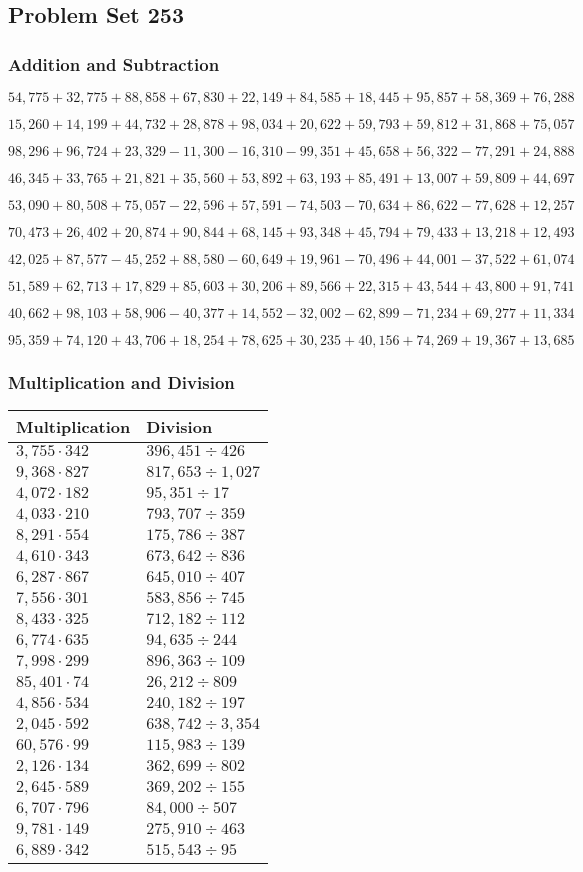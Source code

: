 \hypertarget{problem-set-253}{%
\subsection{Problem Set 253}\label{problem-set-253}}

\hypertarget{addition-and-subtraction}{%
\subsubsection{Addition and
Subtraction}\label{addition-and-subtraction}}

\(54,775+32,775+88,858+67,830+22,149+84,585+18,445+95,857+58,369+76,288\)

\(15,260+14,199+44,732+28,878+98,034+20,622+59,793+59,812+31,868+75,057\)

\(98,296+96,724+23,329-11,300-16,310-99,351+45,658+56,322-77,291+24,888\)

\(46,345+33,765+21,821+35,560+53,892+63,193+85,491+13,007+59,809+44,697\)

\(53,090+80,508+75,057-22,596+57,591-74,503-70,634+86,622-77,628+12,257\)

\(70,473+26,402+20,874+90,844+68,145+93,348+45,794+79,433+13,218+12,493\)

\(42,025+87,577-45,252+88,580-60,649+19,961-70,496+44,001-37,522+61,074\)

\(51,589+62,713+17,829+85,603+30,206+89,566+22,315+43,544+43,800+91,741\)

\(40,662+98,103+58,906-40,377+14,552-32,002-62,899-71,234+69,277+11,334\)

\(95,359+74,120+43,706+18,254+78,625+30,235+40,156+74,269+19,367+13,685\)

\hypertarget{multiplication-and-division}{%
\subsubsection{Multiplication and
Division}\label{multiplication-and-division}}

\begin{longtable}[]{@{}ll@{}}
\toprule
Multiplication & Division\tabularnewline
\midrule
\endhead
\(3,755\cdot342\) & \(396,451÷426\)\tabularnewline
\(9,368\cdot827\) & \(817,653÷1,027\)\tabularnewline
\(4,072\cdot182\) & \(95,351÷17\)\tabularnewline
\(4,033\cdot210\) & \(793,707÷359\)\tabularnewline
\(8,291\cdot554\) & \(175,786÷387\)\tabularnewline
\(4,610\cdot343\) & \(673,642÷836\)\tabularnewline
\(6,287\cdot867\) & \(645,010÷407\)\tabularnewline
\(7,556\cdot301\) & \(583,856÷745\)\tabularnewline
\(8,433\cdot325\) & \(712,182÷112\)\tabularnewline
\(6,774\cdot635\) & \(94,635÷244\)\tabularnewline
\(7,998\cdot299\) & \(896,363÷109\)\tabularnewline
\(85,401\cdot74\) & \(26,212÷809\)\tabularnewline
\(4,856\cdot534\) & \(240,182÷197\)\tabularnewline
\(2,045\cdot592\) & \(638,742÷3,354\)\tabularnewline
\(60,576\cdot99\) & \(115,983÷139\)\tabularnewline
\(2,126\cdot134\) & \(362,699÷802\)\tabularnewline
\(2,645\cdot589\) & \(369,202÷155\)\tabularnewline
\(6,707\cdot796\) & \(84,000÷507\)\tabularnewline
\(9,781\cdot149\) & \(275,910÷463\)\tabularnewline
\(6,889\cdot342\) & \(515,543÷95\)\tabularnewline
\bottomrule
\end{longtable}
